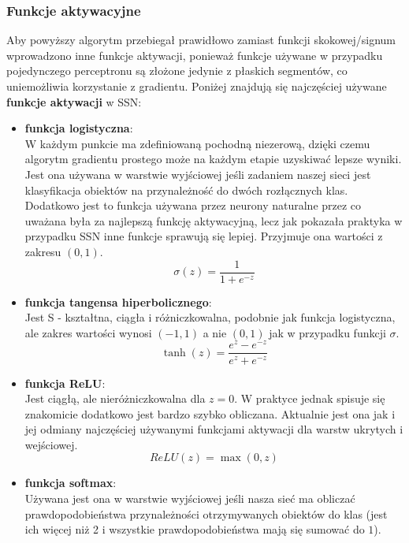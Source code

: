 \documentclass{article}
\begin{document}
\subsubsection{Funkcje aktywacyjne}
\label{sec:fa}
Aby powyższy algorytm przebiegał prawidłowo zamiast funkcji skokowej/signum wprowadzono inne 
funkcje aktywacji, ponieważ funkcje używane w przypadku pojedynczego perceptronu są złożone
jedynie z płaskich segmentów, co uniemożliwia korzystanie z gradientu. Poniżej znajdują się 
najczęściej używane \textbf{funkcje aktywacji} w SSN:
\begin{itemize}
\item \textbf{funkcja logistyczna}:\\
W każdym punkcie ma zdefiniowaną pochodną niezerową, dzięki czemu algorytm gradientu prostego
może na każdym etapie uzyskiwać lepsze wyniki. Jest ona używana w warstwie wyjściowej jeśli
zadaniem naszej sieci jest klasyfikacja obiektów na przynależność do dwóch rozłącznych klas.
Dodatkowo jest to funkcja używana przez neurony 
naturalne przez co uważana była za najlepszą funkcję aktywacyjną, lecz jak pokazała praktyka
w przypadku SSN inne funkcje sprawują się lepiej. Przyjmuje ona wartości z zakresu $(0,1)$.
\begin{equation}
\sigma(z) = \frac{1}{1 + e^{-z}}
\end{equation}
\item \textbf{funkcja tangensa hiperbolicznego}:\\
Jest S - kształtna, ciągła i różniczkowalna, podobnie jak funkcja logistyczna, 
ale zakres wartości wynosi $(-1, 1)$ a nie $(0, 1)$ jak w przypadku funkcji 
$\sigma$.
\begin{equation}
	\tanh(z) = \frac{e^z - e^{-z}}{e^z + e^{-z}}
\end{equation}
\item \textbf{funkcja ReLU}:\\
Jest ciągłą, ale nieróżniczkowalna dla $z = 0$. W praktyce jednak spisuje się znakomicie 
dodatkowo jest bardzo szybko obliczana. Aktualnie jest ona jak i jej odmiany najczęściej
używanymi funkcjami aktywacji dla warstw ukrytych i wejściowej. 
\begin{equation}
	ReLU(z) = \max(0, z)
\end{equation}
\item \textbf{funkcja softmax}:\\
Używana jest ona w warstwie wyjściowej jeśli nasza sieć ma obliczać
prawdopodobieństwa przynależności otrzymywanych obiektów  do klas 
(jest ich więcej niż 2 i wszystkie prawdopodobieństwa mają się sumować do $1$).

\end{itemize}
\end{document}
